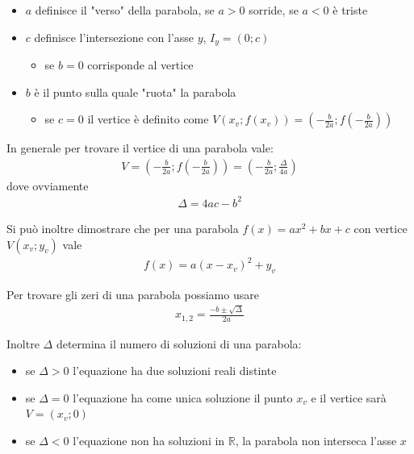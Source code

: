 \documentclass[../main.tex]{subfiles}
\begin{document}
\begin{itemize}
    \item $a$ definisce il "verso" della parabola, se $a>0$ sorride, se $a<0$ è triste
    \item $c$ definisce l'intersezione con l'asse $y$, $I_y = (0;c)$
    \begin{itemize}
        \item se $b=0$ corrisponde al vertice
    \end{itemize}
    \item $b$ è il punto sulla quale "ruota" la parabola
    \begin{itemize}
        \item se $c=0$ il vertice è definito come $V(x_v;f(x_v)) = (-\frac{b}{2a};f(-\frac{b}{2a}))$
    \end{itemize}
\end{itemize}

\vspace{1cm}
In generale per trovare il vertice di una parabola vale:
\begin{align*}
    V = (-\frac{b}{2a};f(-\frac{b}{2a})) = (-\frac{b}{2a}; \frac{\Delta}{4a})
\end{align*}
dove ovviamente
\begin{align*}
    \Delta = 4ac-b^2
\end{align*}

Si può inoltre dimostrare che per una parabola $f(x) = ax^2 + bx + c$ con vertice $V(x_v;y_v)$ vale
\begin{align*}
    f(x) = a(x-x_v)^2 + y_v
\end{align*}

\vspace{1cm}
Per trovare gli zeri di una parabola possiamo usare
\begin{align*}
    x_{1,2} = \frac{-b\pm \sqrt{\Delta}}{2a}
\end{align*}

Inoltre $\Delta$ determina il numero di soluzioni di una parabola:
\begin{itemize}
    \item se $\Delta > 0$ l'equazione ha due soluzioni reali distinte
    \item se $\Delta = 0$ l'equazione ha come unica soluzione il punto $x_v$ e il vertice sarà $V = (x_v;0)$
    \item se $\Delta < 0$ l'equazione non ha soluzioni in $\mathbb{R}$, la parabola non interseca l'asse $x$
\end{itemize}
\end{document}
